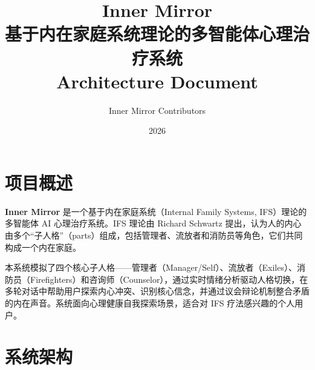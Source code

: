 \documentclass[12pt,a4paper]{ctexart}
\title{\textbf{Inner Mirror}\\[0.5em]
\large 基于内在家庭系统理论的多智能体心理治疗系统\\[0.3em]
\normalsize Architecture Document}
\author{Inner Mirror Contributors}
\date{2026}
\begin{document}
\maketitle
\tableofcontents
\newpage

\section{项目概述}

\textbf{Inner Mirror} 是一个基于内在家庭系统（Internal Family Systems, IFS）理论的多智能体 AI 心理治疗系统。IFS 理论由 Richard Schwartz 提出，认为人的内心由多个``子人格''（parts）组成，包括管理者、流放者和消防员等角色，它们共同构成一个内在家庭。

本系统模拟了四个核心子人格——管理者（Manager/Self）、流放者（Exiles）、消防员（Firefighters）和咨询师（Counselor），通过实时情绪分析驱动人格切换，在多轮对话中帮助用户探索内心冲突、识别核心信念，并通过议会辩论机制整合矛盾的内在声音。系统面向心理健康自我探索场景，适合对 IFS 疗法感兴趣的个人用户。

\section{系统架构}
\end{document}
